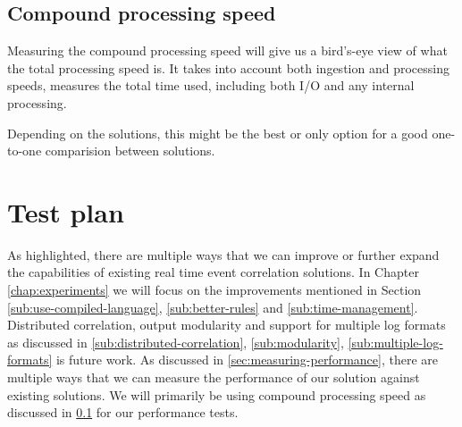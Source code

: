 \subsection{Compound processing speed}
\label{sub:compound-processing-speed}

Measuring the compound processing speed will give us a bird's-eye view of what the total processing speed is. It takes into account both ingestion and processing speeds, measures the total time used, including both I/O and any internal processing.

Depending on the solutions, this might be the best or only option for a good one-to-one comparision between solutions.


\section{Test plan}
As highlighted, there are multiple ways that we can improve or further expand the capabilities of existing real time event correlation solutions. In Chapter \cref{chap:experiments} we will focus on the improvements mentioned in Section \cref{sub:use-compiled-language}, \cref{sub:better-rules} and \cref{sub:time-management}. Distributed correlation, output modularity and support for multiple log formats as discussed in \cref{sub:distributed-correlation}, \cref{sub:modularity}, \cref{sub:multiple-log-formats} is future work.
As discussed in \cref{sec:measuring-performance}, there are multiple ways that we can measure the performance of our solution against existing solutions. We will primarily be using compound processing speed as discussed in \cref{sub:compound-processing-speed} for our performance tests.


